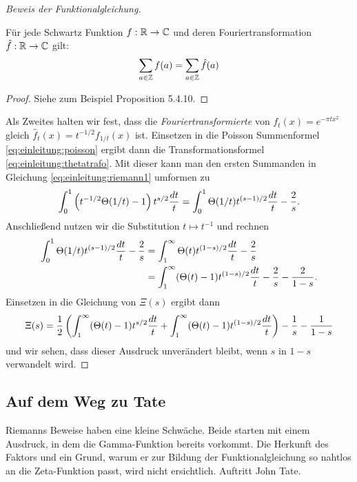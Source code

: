 \begin{proof}[Beweis der Funktionalgleichung]
\begin{satz}
			Für jede Schwartz Funktion $f:\R \to \Komplex$ und deren Fouriertransformation $\hat{f}:\R \to \Komplex$ gilt:
			\begin{align}
				\sum_{a \in \Z} f(a) = \sum_{a \in \Z} \hat{f}(a) \label{eq:einleitung:poisson}
			\end{align}
		\end{satz}
		\begin{proof}
			Siehe zum Beispiel \textcite{deitmar2010} Proposition 5.4.10.
		\end{proof}
		Als Zweites halten wir fest, dass die \emph{Fouriertransformierte} von $f_t(x) = e^{-\pi t x^2}$ gleich $\hat{f}_t(x)= t^{-1/2}f_{1/t}(x)$ ist.
		Einsetzen in die Poisson Summenformel \eqref{eq:einleitung:poisson} ergibt dann die Transformationsformel \eqref{eq:einleitung:thetatrafo}.
		Mit dieser kann man den ersten Summanden in Gleichung \eqref{eq:einleitung:riemann1} umformen zu
		\begin{align*}		
			\int_{0}^{1} \left(t^{-1/2}\Theta(1/t)-1\right) t^{s/2}  \frac{\dx[t]}{t} 
				= \int_{0}^{1}\Theta(1/t) t^{(s-1)/2}  \frac{\dx[t]}{t} - \frac{2}{s}.
		\end{align*}
		Anschließend nutzen wir die Substitution $t \mapsto t^{-1}$ und rechnen
		\begin{align*}
			\int_{0}^{1}\Theta(1/t) t^{(s-1)/2}  \frac{\dx[t]}{t} - \frac{2}{s}
				&= \int_{1}^{\infty} \Theta(t) t^{(1-s)/2}  \frac{\dx[t]}{t} - \frac{2}{s}\\
				&= \int_{1}^{\infty} (\Theta(t) - 1) t^{(1-s)/2}  \frac{\dx[t]}{t} - \frac{2}{s} - \frac{2}{1-s}.
		\end{align*}
		Einsetzen in die Gleichung von $\Xi(s)$ ergibt dann
		\begin{align*}
			\Xi(s)
				= \frac{1}{2} \left( \int_{1}^{\infty} (\Theta(t) - 1) t^{s/2}  \frac{\dx[t]}{t} + \int_{1}^{\infty} (\Theta(t) - 1) t^{(1-s)/2}  \frac{\dx[t]}{t} \right)  - \frac{1}{s} - \frac{1}{1-s}
		\end{align*}
		und wir sehen, dass dieser Ausdruck unverändert bleibt, wenn \glqq{}$s$ in $1-s$ verwandelt wird.\grqq{}
	\end{proof}

\subsection{Auf dem Weg zu Tate}
	Riemanns Beweise haben eine kleine Schwäche. Beide starten mit einem Ausdruck, in dem die Gamma-Funktion bereits vorkommt.
	Die Herkunft des Faktors und ein Grund, warum er zur Bildung der Funktionalgleichung so nahtlos an die Zeta-Funktion passt, wird nicht ersichtlich.
	Auftritt John Tate.
	
